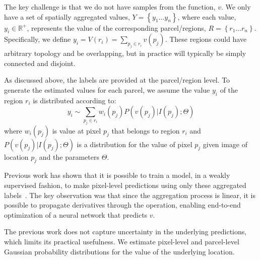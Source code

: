 \documentclass[10pt,twocolumn,a4paper]{article}
\begin{document}
The key challenge is that we do not have samples from the function, $v$.  We only have a set of spatially aggregated values, $Y=\left\{ y_1\ldots y_n\right\}$, where each value, $y_i \in \mathbb{R}^+$, represents the value of the corresponding parcel/regions, $R=\left\{ r_1\ldots r_n\right\}$. Specifically, we define $y_i = V(r_i) = \sum _{p_j\in r_i}v\left( p_j\right)$. These regions could have arbitrary topology and be overlapping, but in practice will typically be simply connected and disjoint.

As discussed above, the labels are provided at the parcel/region level. To generate the estimated values for each parcel, we assume the value $y_i$ of the region $r_i$ is distributed according to:
\begin{equation}
\label{eq:prob_formulation}
    y_i \sim \sum _{p_j \in r_i}w_i(p_j) P(v(p_j)|I(p_j); \Theta) 
\end{equation}
where $w_i(p_j)$ is value at pixel $p_j$ that belongs to region $r_i$ and $P(v(p_j)|I(p_j);  \Theta)$ is a distribution for the value of pixel $p_j$ given image of location $p_j$ and the parameters $\Theta$.

Previous work has shown that it is possible to train a model, in a weakly supervised fashion, to make pixel-level predictions using only these aggregated labels~\cite{jacobs2018weakly}. The key observation was that since the aggregation process is linear, it is possible to propagate derivatives through the operation, enabling end-to-end optimization of a neural network that predicts $v$. 

The previous work does not capture uncertainty in the underlying predictions, which limits its practical usefulness. We estimate pixel-level and parcel-level Gaussian probability distributions for the value of the underlying location.



\end{document}

